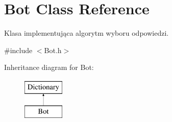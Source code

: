 \hypertarget{class_bot}{}\section{Bot Class Reference}
\label{class_bot}


Klasa implementująca algorytm wyboru odpowiedzi.  




{\ttfamily \#include $<$Bot.\+h$>$}

Inheritance diagram for Bot\+:\begin{figure}[H]
\begin{center}
\leavevmode
\includegraphics[height=2.000000cm]{class_bot}
\end{center}
\end{figure}
